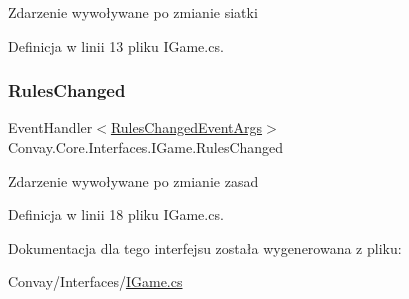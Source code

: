 Zdarzenie wywoływane po zmianie siatki 



Definicja w linii 13 pliku I\+Game.\+cs.

\hypertarget{interface_convay_1_1_core_1_1_interfaces_1_1_i_game_ad5852d1b52121c09411298ab1da6615e}{}\label{interface_convay_1_1_core_1_1_interfaces_1_1_i_game_ad5852d1b52121c09411298ab1da6615e} 
\subsubsection{\texorpdfstring{Rules\+Changed}{RulesChanged}}
{\footnotesize\ttfamily Event\+Handler$<$\hyperlink{class_convay_1_1_core_1_1_rules_changed_event_args}{Rules\+Changed\+Event\+Args}$>$ Convay.\+Core.\+Interfaces.\+I\+Game.\+Rules\+Changed}



Zdarzenie wywoływane po zmianie zasad 



Definicja w linii 18 pliku I\+Game.\+cs.



Dokumentacja dla tego interfejsu została wygenerowana z pliku\+:\begin{DoxyCompactItemize}
\item 
Convay/\+Interfaces/\hyperlink{_i_game_8cs}{I\+Game.\+cs}\end{DoxyCompactItemize}
